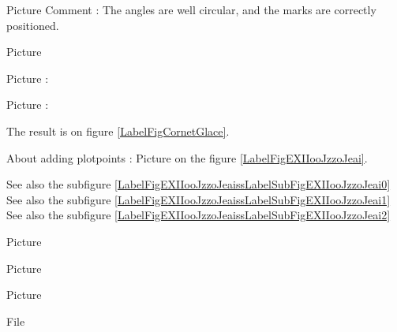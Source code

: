 Picture 
Comment : The angles are well circular, and the marks are correctly positioned.
\begin{center}
   
\end{center}


Picture 
\begin{center}
   
\end{center}
   


Picture : 
\begin{center}
   
\end{center}

Picture : 

The result is on figure \ref{LabelFigCornetGlace}. %
\newcommand{\CaptionFigCornetGlace}{<+Type your caption here+>}


\clearpage


About adding plotpoints : Picture  on the figure \ref{LabelFigEXIIooJzzoJeai}. %
\newcommand{\CaptionFigEXIIooJzzoJeai}{<+Type your caption here+>}

See also the subfigure \ref{LabelFigEXIIooJzzoJeaissLabelSubFigEXIIooJzzoJeai0}
See also the subfigure \ref{LabelFigEXIIooJzzoJeaissLabelSubFigEXIIooJzzoJeai1}
See also the subfigure \ref{LabelFigEXIIooJzzoJeaissLabelSubFigEXIIooJzzoJeai2}


Picture 
\begin{center}

\end{center}



Picture 
\begin{center}

\end{center}




Picture 
\begin{center}
   
\end{center}
   


File 
\begin{center}

\end{center}



